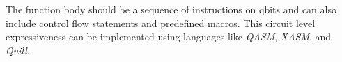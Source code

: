 The  function body should be a sequence of instructions on qbits and can also include control flow statements and predefined macros.  This circuit level expressiveness can be implemented using languages like \textit{QASM}, \textit{XASM}, and \textit{Quill}. 

